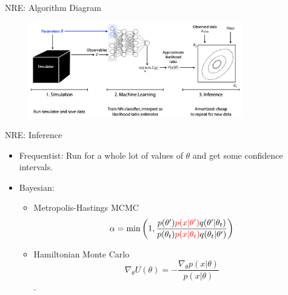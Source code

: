 \documentclass[12pt, aspectratio=169]{beamer}
\let\olditem\item
\renewcommand\item{\olditem\justifying}
\begin{document}
\begin{frame}{NRE: Algorithm Diagram}
    \begin{figure}
		\centering
		\includegraphics[width=0.83\textwidth]{"images/NRE_diagram.png"}
        \caption{\cite{hermans_likelihood-free_2020}}
	\end{figure}
\end{frame}

\begin{frame}{NRE: Inference}
    \begin{itemize}
        \item Frequentist: Run for a whole lot of values of $\theta$ and get some confidence intervals.
        
        \pause 
        
        \item Bayesian:
        \begin{itemize}
            \item Metropolis-Hastings MCMC
            $$\alpha = \min \left(1, \frac{p(\theta') \textcolor{red}{p(x|\theta')}q(\theta'|\theta_t)}{p(\theta_t)\textcolor{red}{p(x|\theta_t)}q(\theta_t|\theta')}\right)$$
            \item Hamiltonian Monte Carlo
            $$\nabla_\theta U(\theta) = - \frac{\nabla_\theta p(x|\theta)}{p(x|\theta)}$$.
        \end{itemize}
    \end{itemize}
\end{frame}

\end{document}
